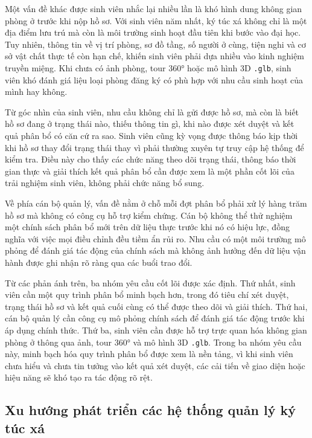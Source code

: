 \documentclass[../DoAn.tex]{subfiles}
\begin{document}
Một vấn đề khác được sinh viên nhắc lại nhiều lần là khó hình dung không gian phòng ở trước khi nộp hồ sơ. Với sinh viên năm nhất, ký túc xá không chỉ là một địa điểm lưu trú mà còn là môi trường sinh hoạt đầu tiên khi bước vào đại học. Tuy nhiên, thông tin về vị trí phòng, sơ đồ tầng, số người ở cùng, tiện nghi và cơ sở vật chất thực tế còn hạn chế, khiến sinh viên phải dựa nhiều vào kinh nghiệm truyền miệng. Khi chưa có ảnh phòng, tour 360° hoặc mô hình 3D \texttt{.glb}, sinh viên khó đánh giá liệu loại phòng đăng ký có phù hợp với nhu cầu sinh hoạt của mình hay không.

Từ góc nhìn của sinh viên, nhu cầu không chỉ là gửi được hồ sơ, mà còn là biết hồ sơ đang ở trạng thái nào, thiếu thông tin gì, khi nào được xét duyệt và kết quả phân bổ có căn cứ ra sao. Sinh viên cũng kỳ vọng được thông báo kịp thời khi hồ sơ thay đổi trạng thái thay vì phải thường xuyên tự truy cập hệ thống để kiểm tra. Điều này cho thấy các chức năng theo dõi trạng thái, thông báo thời gian thực và giải thích kết quả phân bổ cần được xem là một phần cốt lõi của trải nghiệm sinh viên, không phải chức năng bổ sung.

Về phía cán bộ quản lý, vấn đề nằm ở chỗ mỗi đợt phân bổ phải xử lý hàng trăm hồ sơ mà không có công cụ hỗ trợ kiểm chứng. Cán bộ không thể thử nghiệm một chính sách phân bổ mới trên dữ liệu thực trước khi nó có hiệu lực, đồng nghĩa với việc mọi điều chỉnh đều tiềm ẩn rủi ro. Nhu cầu có một môi trường mô phỏng để đánh giá tác động của chính sách mà không ảnh hưởng đến dữ liệu vận hành được ghi nhận rõ ràng qua các buổi trao đổi.

Từ các phản ánh trên, ba nhóm yêu cầu cốt lõi được xác định. Thứ nhất, sinh viên cần một quy trình phân bổ minh bạch hơn, trong đó tiêu chí xét duyệt, trạng thái hồ sơ và kết quả cuối cùng có thể được theo dõi và giải thích. Thứ hai, cán bộ quản lý cần công cụ mô phỏng chính sách để đánh giá tác động trước khi áp dụng chính thức. Thứ ba, sinh viên cần được hỗ trợ trực quan hóa không gian phòng ở thông qua ảnh, tour 360° và mô hình 3D \texttt{.glb}. Trong ba nhóm yêu cầu này, minh bạch hóa quy trình phân bổ được xem là nền tảng, vì khi sinh viên chưa hiểu và chưa tin tưởng vào kết quả xét duyệt, các cải tiến về giao diện hoặc hiệu năng sẽ khó tạo ra tác động rõ rệt.

\subsection{Xu hướng phát triển các hệ thống quản lý ký túc xá}
\end{document}
